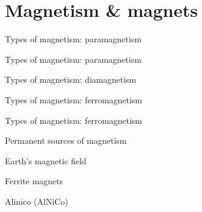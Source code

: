 \documentclass[compress]{beamer}
\makeatletter
\let\beamer@writeslidentry@miniframeson=\beamer@writeslidentry
\newcommand*{\miniframeson}{\let\beamer@writeslidentry=\beamer@writeslidentry@miniframeson}
\makeatother
\begin{document}
\miniframeson


\section[Magnets]{Magnetism \& magnets}

{
\begin{frame}{Types of magnetism: paramagnetism}

\end{frame}
}

{
\begin{frame}{Types of magnetism: paramagnetism}

\end{frame}
}
{
\begin{frame}{Types of magnetism: diamagnetism}

\end{frame}
}
{
\begin{frame}{Types of magnetism: ferromagnetism}

\end{frame}
}
{
\begin{frame}{Types of magnetism: ferromagnetism}

\end{frame}
}
{
\begin{frame}{Permanent sources of magnetism}

\end{frame}
}
{
\begin{frame}{Earth's magnetic field}

\end{frame}
}
{
\begin{frame}{Ferrite magnets}

\end{frame}
}
{
\begin{frame}{Alinico (AlNiCo)}

\end{frame}
}
\end{document}
